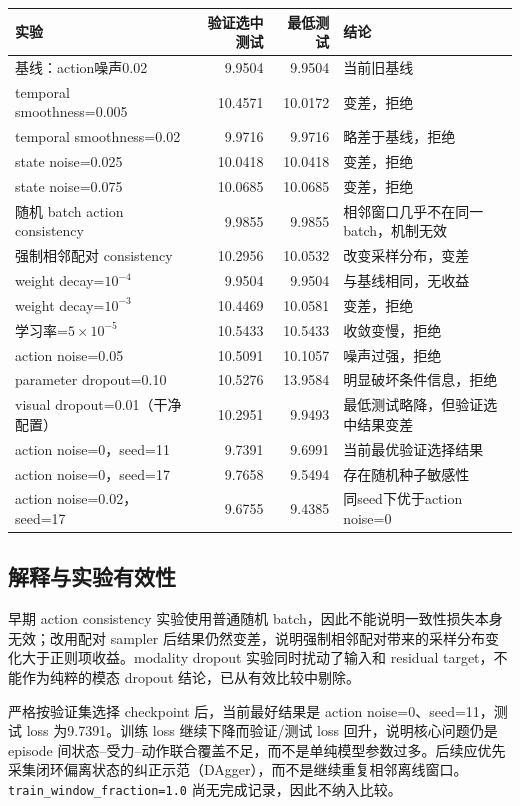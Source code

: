 \documentclass[UTF8,a4paper,11pt,fontset=none]{ctexart}
\begin{document}
\begin{longtable}{p{}r r p{}}
\toprule
实验 & 验证选中测试 & 最低测试 & 结论 \\
\midrule
基线：action噪声0.02 & 9.9504 & 9.9504 & 当前旧基线 \\
temporal smoothness=0.005 & 10.4571 & 10.0172 & 变差，拒绝 \\
temporal smoothness=0.02 & 9.9716 & 9.9716 & 略差于基线，拒绝 \\
state noise=0.025 & 10.0418 & 10.0418 & 变差，拒绝 \\
state noise=0.075 & 10.0685 & 10.0685 & 变差，拒绝 \\
随机 batch action consistency & 9.9855 & 9.9855 & 相邻窗口几乎不在同一 batch，机制无效 \\
强制相邻配对 consistency & 10.2956 & 10.0532 & 改变采样分布，变差 \\
weight decay=$10^{-4}$ & 9.9504 & 9.9504 & 与基线相同，无收益 \\
weight decay=$10^{-3}$ & 10.4469 & 10.0581 & 变差，拒绝 \\
学习率=$5\times10^{-5}$ & 10.5433 & 10.5433 & 收敛变慢，拒绝 \\
action noise=0.05 & 10.5091 & 10.1057 & 噪声过强，拒绝 \\
parameter dropout=0.10 & 10.5276 & 13.9584 & 明显破坏条件信息，拒绝 \\
visual dropout=0.01（干净配置） & 10.2951 & 9.9493 & 最低测试略降，但验证选中结果变差 \\
action noise=0，seed=11 & 9.7391 & 9.6991 & 当前最优验证选择结果 \\
action noise=0，seed=17 & 9.7658 & 9.5494 & 存在随机种子敏感性 \\
action noise=0.02，seed=17 & 9.6755 & 9.4385 & 同seed下优于action noise=0 \\
\bottomrule
\end{longtable}

\subsection{解释与实验有效性}
早期 action consistency 实验使用普通随机 batch，因此不能说明一致性损失本身无效；改用配对 sampler 后结果仍然变差，说明强制相邻配对带来的采样分布变化大于正则项收益。modality dropout 实验同时扰动了输入和 residual target，不能作为纯粹的模态 dropout 结论，已从有效比较中剔除。

严格按验证集选择 checkpoint 后，当前最好结果是 action noise=0、seed=11，测试 loss 为9.7391。训练 loss 继续下降而验证/测试 loss 回升，说明核心问题仍是 episode 间状态--受力--动作联合覆盖不足，而不是单纯模型参数过多。后续应优先采集闭环偏离状态的纠正示范（DAgger），而不是继续重复相邻离线窗口。\texttt{train\_window\_fraction=1.0} 尚无完成记录，因此不纳入比较。
\end{document}
